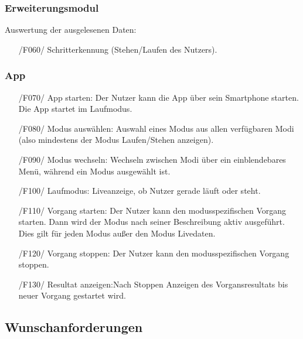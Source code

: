\documentclass[a4paper,12pt]{article}
\begin{document}
    \subsubsection{Erweiterungsmodul}
     Auswertung der ausgelesenen Daten:
     \begin{itemize}
      \item[/F060/] Schritterkennung (Stehen/Laufen des Nutzers).
    \end{itemize}
    \subsubsection{App}
      \begin{itemize}
      \item[/F070/] \textsf{App starten:} Der Nutzer kann die App über sein Smartphone starten. Die App startet im Laufmodus.%
      \item[/F080/] \textsf{Modus auswählen:} Auswahl eines Modus aus allen verfügbaren Modi (also mindestens der Modus \glqq Laufen/Stehen anzeigen\grqq). 
      \item[/F090/] \textsf{Modus wechseln:} Wechseln zwischen Modi über ein einblendebares Menü, während ein Modus ausgewählt ist. %
      \item[/F100/] \textsf{Laufmodus:} Liveanzeige, ob Nutzer gerade \glqq läuft\grqq{} oder \glqq steht\grqq{}.
      \item[/F110/] \textsf{Vorgang starten:} Der Nutzer kann den modusspezifischen Vorgang starten. Dann wird der Modus nach seiner Beschreibung aktiv ausgeführt. Dies gilt für jeden Modus außer den Modus \glqq Livedaten\grqq.
      \item[/F120/] \textsf{Vorgang stoppen:} Der Nutzer kann den modusspezifischen Vorgang stoppen.
      \item[/F130/] \textsf{Resultat anzeigen:}Nach Stoppen Anzeigen des Vorgansresultats bis neuer Vorgang gestartet wird.
    \end{itemize}
  \subsection{Wunschanforderungen}
\end{document}
